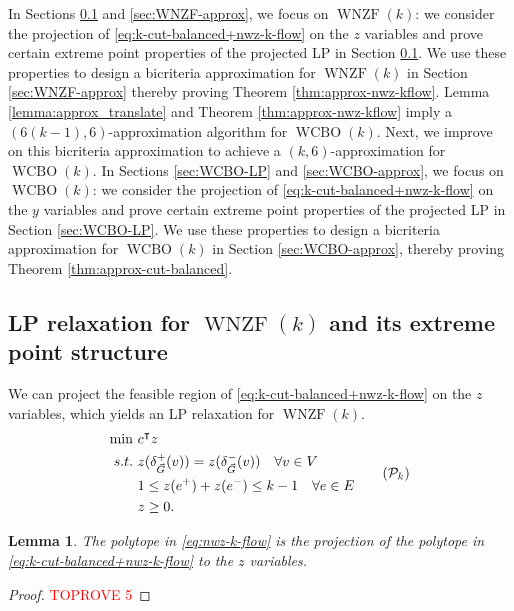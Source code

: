 \documentclass[11pt]{article}
\newtheorem{lemma}[theorem]{Lemma}
\begin{document}
In Sections \ref{sec:WNZF-LP} and \ref{sec:WNZF-approx}, we focus on $\operatorname{WNZF}(k)$: we consider the projection of \eqref{eq:k-cut-balanced+nwz-k-flow} on the $z$ variables and prove certain extreme point properties of the projected LP in Section \ref{sec:WNZF-LP}. We use these properties to design a bicriteria approximation for $\operatorname{WNZF}(k)$ in Section \ref{sec:WNZF-approx} thereby proving Theorem \ref{thm:approx-nwz-kflow}.
Lemma \ref{lemma:approx_translate} and Theorem \ref{thm:approx-nwz-kflow} imply a $(6(k-1),6)$-approximation algorithm for $\operatorname{WCBO}(k)$. Next, we improve on this bicriteria approximation to achieve a $(k, 6)$-approximation for $\operatorname{WCBO}(k)$.  
In Sections \ref{sec:WCBO-LP} and \ref{sec:WCBO-approx}, we focus on $\operatorname{WCBO}(k)$: we consider the projection of \eqref{eq:k-cut-balanced+nwz-k-flow} on the $y$ variables and prove certain extreme point properties of the projected LP in Section \ref{sec:WCBO-LP}. We use these properties to design a bicriteria approximation for $\operatorname{WCBO}(k)$ in Section \ref{sec:WCBO-approx}, thereby proving Theorem \ref{thm:approx-cut-balanced}.

\subsection{LP relaxation for $\operatorname{WNZF}(k)$ and its extreme point structure}\label{sec:WNZF-LP}
We can project the feasible region of \eqref{eq:k-cut-balanced+nwz-k-flow} on the $z$ variables, which yields an LP relaxation for $\operatorname{WNZF}(k)$.
\begin{equation}\label{eq:nwz-k-flow}
    \begin{aligned}
    \min~&c^\intercal z\\
    s.t.~&z(\delta_{\vec{G}}^+(v))=z(\delta_{\vec{G}}^-(v))\quad \forall v\in V\\
    &1\leq z(e^+)+z(e^-)\leq k-1\quad \forall e\in E\\
        &z\geq 0.
    \end{aligned}\tag{$\mathcal{P}_k$}
\end{equation}

\begin{lemma}\label{lemma:proj-z}
    The polytope in \eqref{eq:nwz-k-flow} is the projection of the polytope in \eqref{eq:k-cut-balanced+nwz-k-flow} to the $z$ variables.
\end{lemma}
\begin{proof}\textcolor{red}{TOPROVE 5}\end{proof}
\end{document}
